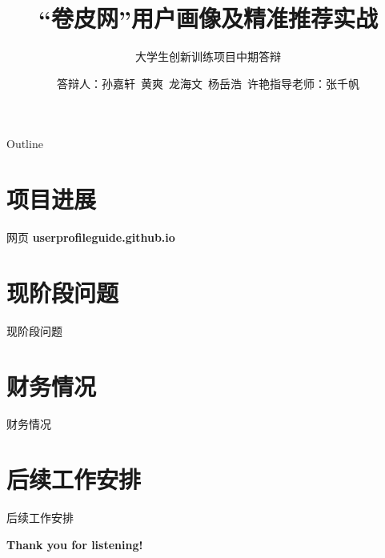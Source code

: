 \documentclass[10pt]{beamer}
\title[中期答辩]{“卷皮网”用户画像及精准推荐实战}
\subtitle{大学生创新训练项目中期答辩}
\author[用户画像与机器学习实战]{答辩人：孙嘉轩\ 黄爽\ 龙海文\ 杨岳浩\ 许艳\newline \newline 指导老师：张千帆}
\institute[]{华中科技大学管理学院}
\begin{document}

\frame{\titlepage}
\begin{frame}{Outline}
\tableofcontents
\end{frame}

\section{项目进展}
    \begin{frame}{网页}
      \textbf{userprofileguide.github.io}
    \end{frame}


\section{现阶段问题}
  \begin{frame}{现阶段问题}

  \end{frame}
\section{财务情况}
  \begin{frame}{财务情况}

  \end{frame}
\section{后续工作安排}
  \begin{frame}{后续工作安排}

  \end{frame}

\begin{frame}
\textbf{Thank you for listening!}
\end{frame}
\end{document}
